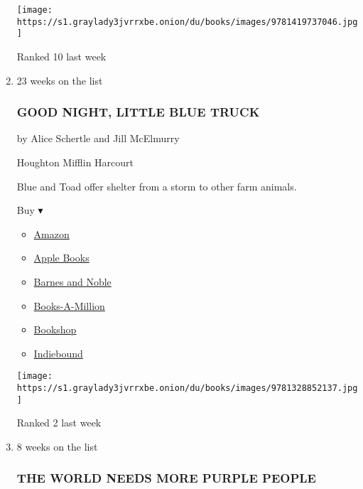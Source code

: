 \begin{enumerate}
  \texttt{[image: https://s1.graylady3jvrrxbe.onion/du/books/images/9781419737046.jpg]}

  Ranked 10 last week
\item
  23 weeks on the list

  \hypertarget{good-night-little-blue-truck}{%
  \subsubsection{GOOD NIGHT, LITTLE BLUE
  TRUCK}\label{good-night-little-blue-truck}}

  by Alice Schertle and Jill McElmurry

  Houghton Mifflin Harcourt

  Blue and Toad offer shelter from a storm to other farm animals.

  Buy ▾

  \begin{itemize}
  \tightlist
  \item
    \href{https://www.amazon.com/Good-Night-Little-Blue-Truck/dp/132885213X?tag=NYTBS-20}{Amazon}
  \item
    \href{https://du-gae-books-dot-nyt-du-prd.appspot.com/buy?title=GOOD+NIGHT\%2C+LITTLE+BLUE+TRUCK\&author=Alice+Schertle+and+Jill+McElmurry}{Apple
    Books}
  \item
    \href{https://www.anrdoezrs.net/click-7990613-11819508?url=https\%3A\%2F\%2Fwww.barnesandnoble.com\%2Fw\%2F\%3Fean\%3D9781328852137}{Barnes
    and Noble}
  \item
    \href{https://www.anrdoezrs.net/click-7990613-35140?url=https\%3A\%2F\%2Fwww.booksamillion.com\%2Fp\%2FGOOD\%2BNIGHT\%252C\%2BLITTLE\%2BBLUE\%2BTRUCK\%2FAlice\%2BSchertle\%2Band\%2BJill\%2BMcElmurry\%2F9781328852137}{Books-A-Million}
  \item
    \href{https://bookshop.org/a/3546/9781328852137}{Bookshop}
  \item
    \href{https://www.indiebound.org/book/9781328852137?aff=NYT}{Indiebound}
  \end{itemize}

  \texttt{[image: https://s1.graylady3jvrrxbe.onion/du/books/images/9781328852137.jpg]}

  Ranked 2 last week
\item
  8 weeks on the list

  \hypertarget{the-world-needs-more-purple-people}{%
  \subsubsection{THE WORLD NEEDS MORE PURPLE
  PEOPLE}\label{the-world-needs-more-purple-people}}


\end{enumerate}
